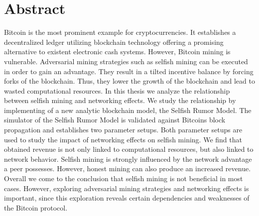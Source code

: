 \chapter*{Abstract}
Bitcoin is the most prominent example for cryptocurrencies. It establishes a decentralized ledger utilizing blockchain technology offering a promising alternative to existent electronic cash systems. However, Bitcoin mining is vulnerable. Adversarial mining strategies such as selfish mining can be executed in order to gain an advantage. They result in a tilted incentive balance by forcing forks of the blockchain. Thus, they lower the growth of the blockchain and lead to wasted computational resources. In this thesis we analyze the relationship between selfish mining and networking effects. We study the relationship by implementing of a new analytic blockchain model, the Selfish Rumor Model. The simulator of the Selfish Rumor Model is validated against Bitcoins block propagation and establishes two parameter setups. Both parameter setups are used to study the impact of networking effects on selfish mining. We find that obtained revenue is not only linked to computational resources, but also linked to network behavior. Selfish mining is strongly influenced by the network advantage a peer possesses. However, honest mining can also produce an increased revenue.
Overall we come to the conclusion that selfish mining is not beneficial in most cases. However, exploring adversarial mining strategies and networking effects is important, since this exploration reveals certain dependencies and weaknesses of the Bitcoin protocol.
